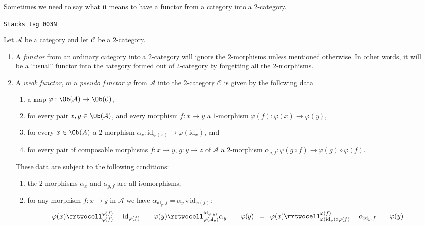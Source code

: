 Sometimes we need to say what it means to have a functor from a
category into a $2$-category.

\begin{definition}
\label{categories-definition-functor-into-2-category}
\href{https://stacks.math.columbia.edu/tag/003N}{\texttt{Stacks tag 003N}}

Let $\mathcal{A}$ be a category and let $\mathcal{C}$ be a $2$-category.
\begin{enumerate}
\item A {\it functor} from an ordinary category into a $2$-category
will ignore the
$2$-morphisms unless mentioned otherwise. In other words, it will be a
``usual'' functor into the category formed out of 2-category by forgetting
all the 2-morphisms.
\item A {\it weak functor}, or
a {\it pseudo functor} $\varphi$ from $\mathcal{A}$ into the 2-category
$\mathcal{C}$ is given by the following data
\begin{enumerate}
\item a map $\varphi : \Ob(\mathcal{A}) \to \Ob(\mathcal{C})$,
\item for every pair $x, y\in \Ob(\mathcal{A})$, and every
morphism $f : x \to y$ a $1$-morphism $\varphi(f) : \varphi(x) \to \varphi(y)$,
\item for every $x\in \Ob(A)$ a $2$-morphism
$\alpha_x : \text{id}_{\varphi(x)} \to \varphi(\text{id}_x)$, and
\item for every pair of composable morphisms $f : x \to y$,
$g : y \to z$ of $\mathcal{A}$ a $2$-morphism
$\alpha_{g, f} : \varphi(g \circ f) \to \varphi(g) \circ \varphi(f)$.
\end{enumerate}
These data are subject to the following conditions:
\begin{enumerate}
\item the $2$-morphisms $\alpha_x$ and $\alpha_{g, f}$ are all
isomorphisms,
\item for any morphism $f : x \to y$ in $\mathcal{A}$ we have
$\alpha_{\text{id}_y, f} = \alpha_y \star \text{id}_{\varphi(f)}$:
$$
\begin{array}{ccccc}\varphi(x)
\rrtwocell^{\varphi(f)}_{\varphi(f)}{\ \ \ \ \text{id}_{\varphi(f)}} &  & \varphi(y)
\rrtwocell^{\text{id}_{\varphi(y)}}_{\varphi(\text{id}_y)}{\alpha_y} &  & \varphi(y)\end{array}
=
\begin{array}{ccc}\varphi(x)
\rrtwocell^{\varphi(f)}_{\varphi(\text{id}_y) \circ \varphi(f)}{\ \ \ \ \alpha_{\text{id}_y, f}} &  & \varphi(y)\end{array}
$$
\end{enumerate}
\end{enumerate}
\end{definition}
